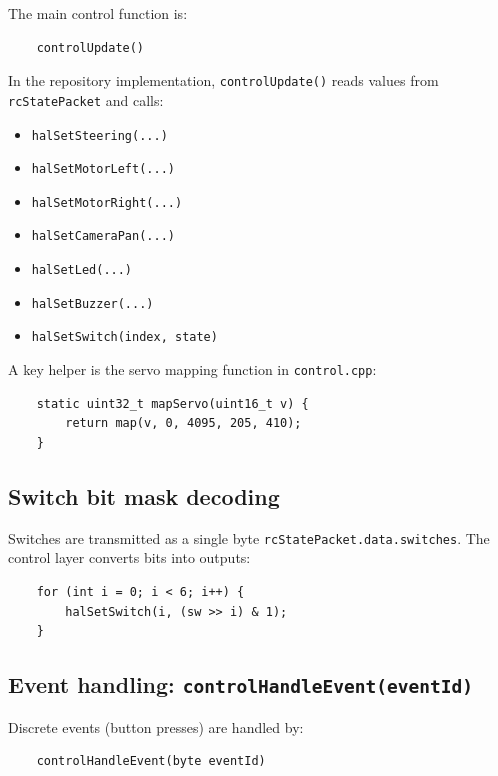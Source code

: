 The main control function is:

\begin{verbatim}
    controlUpdate()
\end{verbatim}

In the repository implementation, \texttt{controlUpdate()} reads values from \texttt{rcStatePacket} and calls:

\begin{itemize}
    \item \texttt{halSetSteering(...)}
    \item \texttt{halSetMotorLeft(...)}
    \item \texttt{halSetMotorRight(...)}
    \item \texttt{halSetCameraPan(...)}
    \item \texttt{halSetLed(...)}
    \item \texttt{halSetBuzzer(...)}
    \item \texttt{halSetSwitch(index, state)}
\end{itemize}

A key helper is the servo mapping function in \texttt{control.cpp}:

\begin{verbatim}
    static uint32_t mapServo(uint16_t v) {
        return map(v, 0, 4095, 205, 410);
    }
\end{verbatim}

\subsection{Switch bit mask decoding}
\label{subsec:control-hal-switch-mask}

Switches are transmitted as a single byte \texttt{rcStatePacket.data.switches}.
The control layer converts bits into outputs:

\begin{verbatim}
    for (int i = 0; i < 6; i++) {
        halSetSwitch(i, (sw >> i) & 1);
    }
\end{verbatim}

\subsection{Event handling: \texttt{controlHandleEvent(eventId)}}
\label{subsec:control-hal-events}

Discrete events (button presses) are handled by:

\begin{verbatim}
    controlHandleEvent(byte eventId)
\end{verbatim}

